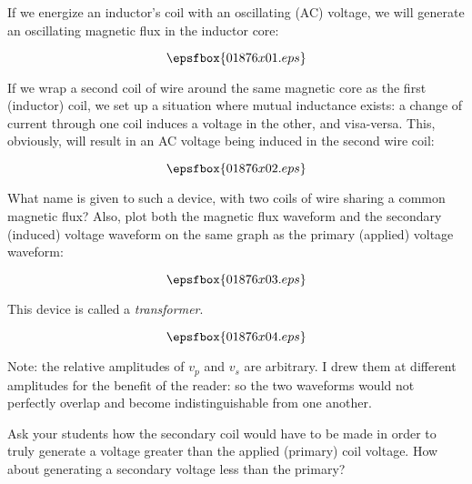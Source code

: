 

If we energize an inductor's coil with an oscillating (AC) voltage, we will generate an oscillating magnetic flux in the inductor core:

$$\epsfbox{01876x01.eps}$$

If we wrap a second coil of wire around the same magnetic core as the first (inductor) coil, we set up a situation where mutual inductance exists: a change of current through one coil induces a voltage in the other, and visa-versa.  This, obviously, will result in an AC voltage being induced in the second wire coil:

$$\epsfbox{01876x02.eps}$$

What name is given to such a device, with two coils of wire sharing a common magnetic flux?  Also, plot both the magnetic flux waveform and the secondary (induced) voltage waveform on the same graph as the primary (applied) voltage waveform:

$$\epsfbox{01876x03.eps}$$







This device is called a {\it transformer}.

$$\epsfbox{01876x04.eps}$$

Note: the relative amplitudes of $v_p$ and $v_s$ are arbitrary.  I drew them at different amplitudes for the benefit of the reader: so the two waveforms would not perfectly overlap and become indistinguishable from one another.







Ask your students how the secondary coil would have to be made in order to truly generate a voltage greater than the applied (primary) coil voltage.  How about generating a secondary voltage less than the primary?




